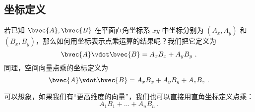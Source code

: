 \subsection{坐标定义}
若已知 $\bvec{A}, \bvec{B}$ 在平面直角坐标系 $xy$ 中坐标分别为 $(A_x, A_y)$ 和  $(B_x, B_y)$，那么如何用坐标表示点乘运算的结果呢？我们把它定义为
\begin{equation}\label{eq_Dot_5}
\bvec{A} \vdot \bvec{B} = A_x B_x + A_y B_y~.
\end{equation}
同理，空间向量点乘的坐标定义为
\begin{equation}\label{eq_Dot_4}
\bvec{A} \vdot \bvec{B} = A_x B_x + A_y B_y + A_z B_z	~.
\end{equation}

可以想象，如果我们有“更高维度的向量”，我们也可以直接用直角坐标定义点乘：
\begin{equation}
A_1 B_1 + \dots + A_n B_n ~.
\end{equation}



